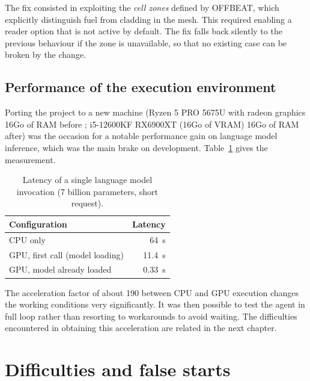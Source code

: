 \documentclass[12pt,a4paper]{report}
\begin{document}
The fix consisted in exploiting the \textit{cell zones} defined by OFFBEAT,
which explicitly distinguish fuel from cladding in the mesh. This required
enabling a reader option that is not active by default. The fix falls back
silently to the previous behaviour if the zone is unavailable, so that no
existing case can be broken by the change.

\section{Performance of the execution environment}
\label{sec:latence}

Porting the project to a new machine (Ryzen 5 PRO 5675U with radeon graphics 16Go of RAM before ; i5-12600KF RX6900XT (16Go of VRAM) 16Go of RAM after) was the occasion for a notable performance
gain on language model inference, which was the main brake on development.
Table~\ref{tab:latence} gives the measurement.

\begin{table}[htbp]
\centering
\caption[Latency of a model invocation]{Latency of a single language model
invocation (\num{7} billion parameters, short request).}
\label{tab:latence}
\begin{tabularx}{0.85\textwidth}{@{}Xr@{}}
\toprule
\textbf{Configuration} & \textbf{Latency}\\
\midrule
CPU only & \SI{64}{\second}\\
GPU, first call (model loading) & \SI{11.4}{\second}\\
GPU, model already loaded & \SI{0.33}{\second}\\
\bottomrule
\end{tabularx}
\end{table}

The acceleration factor of about \num{190} between CPU and GPU execution changes
the working conditions very significantly. It was then possible to test the agent in
full loop rather than resorting to workarounds to avoid waiting. The
difficulties encountered in obtaining this acceleration are related in the next
chapter.

\clearpage
\chapter{Difficulties and false starts}
\end{document}
